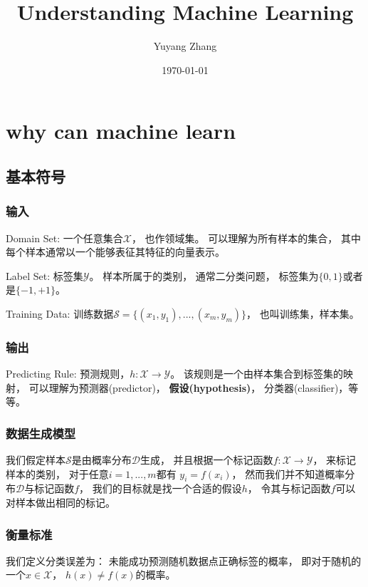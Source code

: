 \documentclass[UTF8]{ctexart}
\title{Understanding Machine Learning}
\author{Yuyang Zhang}
\date{\today}
\begin{document}
\maketitle
\newpage

\tableofcontents
\newpage



%
%

\section{why can machine learn}
\subsection{基本符号}
\subsubsection{输入}
Domain Set:
一个任意集合$\mathcal{X}$，
也作领域集。
可以理解为所有样本的集合，
其中每个样本通常以一个能够表征其特征的向量表示。

Label Set:
标签集$\mathcal{Y}$。
样本所属于的类别，
通常二分类问题，
标签集为$\{0,1\}$或者是$\{-1,+1\}$。

Training Data:
训练数据$\mathcal{S}=\{(x_1,y_1),...,(x_m,y_m)\}$，
也叫训练集，样本集。

\subsubsection{输出}
Predicting Rule:
预测规则，$h:\mathcal{X}\rightarrow\mathcal{Y}$。
该规则是一个由样本集合到标签集的映射，
可以理解为预测器(predictor)，
\textbf	{假设(hypothesis)}，
分类器(classifier)，等等。

\subsubsection{数据生成模型}
我们假定样本$\mathcal{S}$是由概率分布$\mathcal{D}$生成，
并且根据一个标记函数$f:\mathcal{X}\rightarrow\mathcal{Y}$，
来标记样本的类别，
对于任意$i=1,...,m$都有
$y_i=f(x_i)$，
然而我们并不知道概率分布$\mathcal{D}$与标记函数$f$，
我们的目标就是找一个合适的假设$h$，
令其与标记函数$f$可以对样本做出相同的标记。

\subsubsection{衡量标准}
我们定义分类误差为：
未能成功预测随机数据点正确标签的概率，
即对于随机的一个$x\in\mathcal{X}$，
$h(x)\neq f(x)$的概率。
\end{document}
